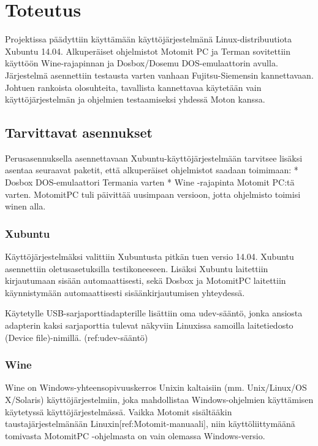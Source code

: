 \documentclass[]{article}
\begin{document}
\chapter{Toteutus}\label{toteutus}

Projektissa päädyttiin käyttämään käyttöjärjestelmänä
Linux-distribuutiota Xubuntu 14.04. Alkuperäiset ohjelmistot Motomit PC
ja Terman sovitettiin käyttöön Wine-rajapinnan ja Dosbox/Dosemu
DOS-emulaattorin avulla. Järjestelmä asennettiin testausta varten
vanhaan Fujitsu-Siemensin kannettavaan. Johtuen rankoista olosuhteita,
tavallista kannettavaa käytetään vain käyttöjärjestelmän ja ohjelmien
testaamiseksi yhdessä Moton kanssa.

\section{Tarvittavat asennukset}\label{tarvittavat-asennukset}

Perusasennuksella asennettavaan Xubuntu-käyttöjärjestelmään tarvitsee
lisäksi asentaa seuraavat paketit, että alkuperäiset ohjelmistot saadaan
toimimaan: * Dosbox DOS-emulaattori Termania varten * Wine -rajapinta
Motomit PC:tä varten. MotomitPC tuli päivittää uusimpaan versioon, jotta
ohjelmisto toimisi winen alla.

\subsection{Xubuntu}\label{xubuntu}

Käyttöjärjestelmäksi valittiin Xubuntusta pitkän tuen versio 14.04.
Xubuntu asennettiin oletusasetuksilla testikoneeseen. Lisäksi Xubuntu
laitettiin kirjautumaan sisään automaattisesti, sekä Dosbox ja MotomitPC
laitettiin käynnistymään automaattisesti sisäänkirjautumisen yhteydessä.

Käytetylle USB-sarjaporttiadapterille lisättiin oma udev-sääntö, jonka
ansiosta adapterin kaksi sarjaporttia tulevat näkyviin Linuxissa
samoilla laitetiedosto (Device file)-nimillä. (ref:udev-sääntö)

\subsection{Wine}\label{wine}

Wine on Windows-yhteensopivuuskerros Unixin kaltaisiin (mm.
Unix/Linux/OS X/Solaris) käyttöjärjestelmiin, joka mahdollistaa
Windows-ohjelmien käyttämisen käytetyssä käyttöjärjestelmässä. Vaikka
Motomit sisältääkin taustajärjestelmänään
Linuxin{[}ref:Motomit-manuaali{]}, niin käyttöliittymäänä tomivasta
MotomitPC -ohjelmasta on vain olemassa Windows-versio.
\end{document}
